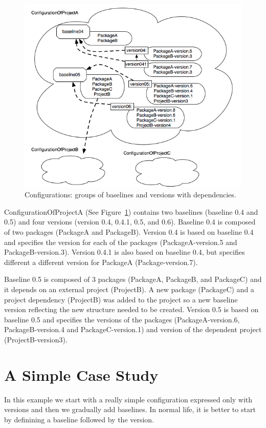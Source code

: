 \documentclass[a4paper,10pt,twoside]{book}
\begin{document}
 
\begin{figure}
\begin{center}
\includegraphics[width=0.8\linewidth]{configurations}
\caption{Configurations: groups of baselines and versions with dependencies.\label{configurations}}
\end{center}
\end{figure} 


ConfigurationOfProjectA (See Figure~\ref{configurations}) contains two baselines (baseline 0.4 and 0.5) and four versions (version 0.4, 0.4.1, 0.5, and 0.6). Baseline 0.4 is composed of two packages (PackageA and PackageB). Version 0.4 is based on baseline 0.4 and specifies the version for each of the packages (PackageA-version.5 and PackageB-version.3). Version 0.4.1 is also based on baseline 0.4, but specifies different a different version for PackageA (Package-version.7).

Baseline 0.5 is composed of 3 packages (PackageA, PackageB, and PackageC) and it depends on an external project (ProjectB). A new package (PackageC) and a project dependency (ProjectB) was added to the project so a new baseline version reflecting the new structure needed to be created. Version 0.5 is based on baseline 0.5 and specifies the versions of the packages (PackageA-version.6, PackageB-version.4 and PackageC-version.1) and version of the dependent project (ProjectB-version3).



\section{A Simple Case Study}

In this example we start with a really simple configuration expressed only with versions and then we gradually add baselines. In normal life, it is better to start by definining a baseline followed by the version.
\end{document}
